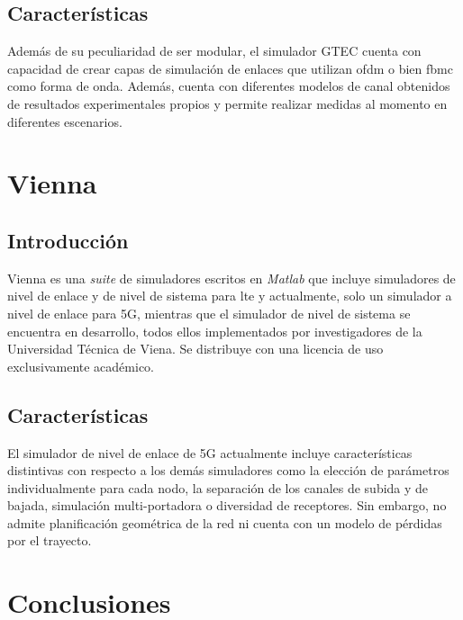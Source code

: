 \subsection{Características}
Además de su peculiaridad de ser modular, el simulador GTEC cuenta con capacidad de crear capas de simulación de enlaces que utilizan \ac{ofdm} o bien \ac{fbmc} como forma de onda. Además, cuenta con diferentes modelos de canal obtenidos de resultados experimentales propios y permite realizar medidas al momento en diferentes escenarios.

\section{Vienna}
\subsection{Introducción}
Vienna \cite{vienna} es una \textit{suite} de simuladores escritos en \textit{Matlab} que incluye simuladores de nivel de enlace y de nivel de sistema para \acs{lte} y actualmente, solo un simulador a nivel de enlace para 5G, mientras que el simulador de nivel de sistema se encuentra en desarrollo, todos ellos implementados por investigadores de la Universidad Técnica de Viena. Se distribuye con una licencia de uso exclusivamente académico.
\subsection{Características}
El simulador de nivel de enlace de 5G actualmente incluye características distintivas con respecto a los demás simuladores como la elección de parámetros individualmente para cada nodo, la separación de los canales de subida y de bajada, simulación multi-portadora o diversidad de receptores. Sin embargo, no admite planificación geométrica de la red ni cuenta con un modelo de pérdidas por el trayecto.

\section{Conclusiones}
